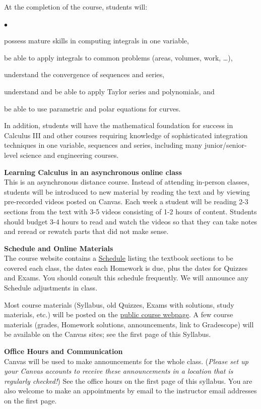 \documentclass[12pt]{article}
\renewcommand{\emph}[1]{\textsf{\textbf{#1}}}
\newcommand{\localhead}[1]{\par\smallskip\textbf{#1} \smallskip\nobreak\\}%
\def\heading#1{\localhead{\large\emph{#1}}}
\newenvironment{clist}%
{\bgroup\parskip 0pt\begin{list}{$\bullet$}{\partopsep 4pt\topsep 0pt\itemsep -2pt}}%
{\end{list}\egroup}%
\begin{document}
At the completion of the course, students will:
\begin{clist}
\item possess mature skills in computing integrals in one variable,
\item be able to apply integrals to common problems (areas, volumes, work, \dots),
\item understand the convergence of sequences and series,
\item understand and be able to apply Taylor series and polynomials, and
\item be able to use parametric and polar equations for curves.
\end{clist}
In addition, students will have the mathematical foundation for success in Calculus III and other courses requiring knowledge of sophisticated integration techniques in one variable, sequences and series, including many junior/senior-level science and engineering courses.

\clearpage\newpage
\phantom{x}
\vspace{-4mm}

\heading{Learning Calculus in an asynchronous online class}
This is an asynchronous distance course. Instead of attending in-person classes, students will be introduced to new material by reading the text and by viewing pre-recorded videos posted on Canvas. Each week a student  will be reading 2-3 sections from the text with 3-5 videos consisting of 1-2 hours of content. Students should budget 3-4 hours to read and watch the
videos so that they can take notes and reread or rewatch parts that did not make sense.

\heading{Schedule and Online Materials}
The course website contains a \href{https://uaf-math.github.io/calc2/assets/general/S26/asynchronous/schedule_v1.pdf}{Schedule} listing the textbook sections to be covered each class, the dates each Homework is due, plus the dates for Quizzes and Exams. You should consult this schedule frequently.  We will announce any Schedule adjustments in class.

Most course materials (Syllabus, old Quizzes, Exams with solutions, study materials, etc.) will be posted on the \href{https://uaf-math.github.io/calc2/}{public course webpage}.  A few course materials (grades, Homework solutions, announcements, link to Gradescope) will be available on the Canvas sites; see the first page of this Syllabus.

\heading{Office Hours and Communication}
Canvas will be used to make announcements for the whole class.  (\textsl{Please set up your Canvas accounts to receive these announcements in a location that is regularly checked!})  See the office hours on the first page of this syllabus.  You are also welcome to make an appointments by email to the instructor email addresses on the first page.\\
\end{document}
